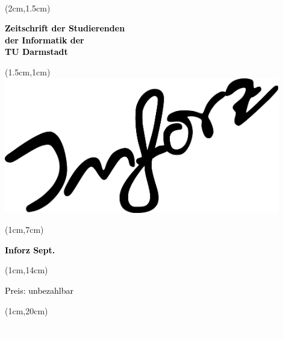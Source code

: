 \begin{titlepage}~


\begin{textblock*}{12cm}(2cm,1.5cm)
\begin{flushleft}
\large\sffamily\textbf{
\newline
\textcolor{black}{Zeitschrift der Studierenden\\ 
der Informatik der \\
TU Darmstadt} } 
\end{flushleft}
\end{textblock*}


\begin{textblock*}{12cm}(1.5cm,1cm)
\includegraphics[width=12cm]{grafik/inforz}
\end{textblock*}


\begin{textblock*}{5cm}(1cm,7cm)
\begin{rotate}{90}
\sffamily\huge\textbf{
	\textcolor{black}{Inforz Sept. \the\year}}
\end{rotate}
\end{textblock*}


\begin{textblock*}{2cm}(1cm,14cm)
\begin{rotate}{90}
\textcolor{black}{\sffamily\small Preis: unbezahlbar}
\end{rotate}
\end{textblock*}


\begin{textblock*}{2cm}(1cm,20cm)
\begin{rotate}{90}
\textcolor{white}{\sffamily ISSN: 1614-4295}
\end{rotate}
\end{textblock*}

\end{titlepage}
\newpage
